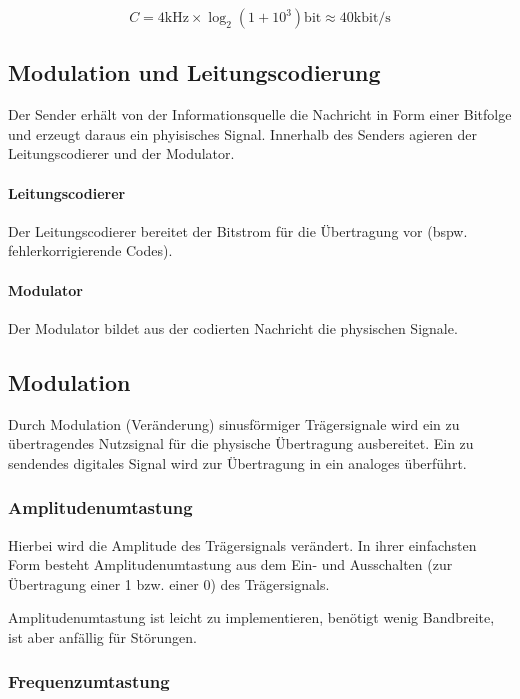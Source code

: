 \documentclass[a4paper, 14pt]{article}
\begin{document}
	\begin{equation*}
		C = 4\text{kHz} \times \log_2\left(1 + 10^3\right)\text{bit} \approx 40\text{kbit/s}
	\end{equation*}

	\subsection{Modulation und Leitungscodierung}

	Der Sender erhält von der Informationsquelle die Nachricht in Form einer Bitfolge und erzeugt daraus ein phyisisches Signal.
	Innerhalb des Senders agieren der Leitungscodierer und der Modulator.

	\paragraph{Leitungscodierer}

	Der Leitungscodierer bereitet der Bitstrom für die Übertragung vor (bspw. fehlerkorrigierende Codes).

	\paragraph{Modulator}

	Der Modulator bildet aus der codierten Nachricht die physischen Signale.

	\subsection{Modulation}

	Durch Modulation (Veränderung) sinusförmiger Trägersignale wird ein zu übertragendes Nutzsignal für die physische Übertragung ausbereitet.
	Ein zu sendendes digitales Signal wird zur Übertragung in ein analoges überführt.

	\subsubsection{Amplitudenumtastung}

	Hierbei wird die Amplitude des Trägersignals verändert.
	In ihrer einfachsten Form besteht Amplitudenumtastung aus dem Ein- und Ausschalten (zur Übertragung einer 1 bzw. einer 0) des Trägersignals.

	Amplitudenumtastung ist leicht zu implementieren, benötigt wenig Bandbreite, ist aber anfällig für Störungen.

	\subsubsection{Frequenzumtastung}
\end{document}

